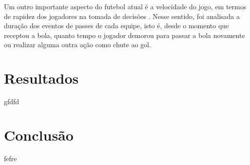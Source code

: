 \documentclass{article}
\begin{document}
Um outro importante aspecto do futebol atual é a velocidade do jogo, em termos
de rapidez dos jogadores na tomada de decisões \cite{cox2022linhas}. Nesse
sentido, foi analisada a duração dos eventos de passes de cada equipe, isto é,
desde o momento que receptou a bola, quanto tempo o jogador demorou para passar
a bola novamente ou realizar alguma outra ação como chute ao gol.

\section{Resultados}

gfdfd

\section{Conclusão}

fefre

\newpage

\renewcommand{\refname}{Referências Bibliográficas}

\nocite{*}
\end{document}
